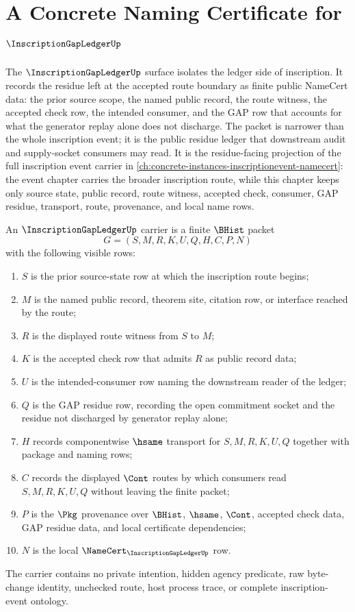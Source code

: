 \chapter{A Concrete Naming Certificate for $\InscriptionGapLedgerUp$}
\label{ch:concrete-instances-inscription-gap-ledger-namecert}

The $\InscriptionGapLedgerUp$ surface isolates the ledger side of inscription. It records the residue left at the accepted route boundary as finite public NameCert data: the prior source scope, the named public record, the route witness, the accepted check row, the intended consumer, and the GAP row that accounts for what the generator replay alone does not discharge. The packet is narrower than the whole inscription event; it is the public residue ledger that downstream audit and supply-socket consumers may read. It is the residue-facing projection of the full inscription event carrier in \autoref{ch:concrete-instances-inscriptionevent-namecert}: the event chapter carries the broader inscription route, while this chapter keeps only source state, public record, route witness, accepted check, consumer, GAP residue, transport, route, provenance, and local name rows.

\begin{definition}
\label{def:inscription-gap-ledger-carrier}
An $\InscriptionGapLedgerUp$ carrier is a finite $\BHist$ packet
$$
G=(S,M,R,K,U,Q,H,C,P,N)
$$
with the following visible rows:
\begin{enumerate}
\item $S$ is the prior source-state row at which the inscription route begins;
\item $M$ is the named public record, theorem site, citation row, or interface reached by the route;
\item $R$ is the displayed route witness from $S$ to $M$;
\item $K$ is the accepted check row that admits $R$ as public record data;
\item $U$ is the intended-consumer row naming the downstream reader of the ledger;
\item $Q$ is the GAP residue row, recording the open commitment socket and the residue not discharged by generator replay alone;
\item $H$ records componentwise $\hsame$ transport for $S,M,R,K,U,Q$ together with package and naming rows;
\item $C$ records the displayed $\Cont$ routes by which consumers read $S,M,R,K,U,Q$ without leaving the finite packet;
\item $P$ is the $\Pkg$ provenance over $\BHist$, $\hsame$, $\Cont$, accepted check data, GAP residue data, and local certificate dependencies;
\item $N$ is the local $\NameCert_{\InscriptionGapLedgerUp}$ row.
\end{enumerate}
The carrier contains no private intention, hidden agency predicate, raw byte-change identity, unchecked route, host process trace, or complete inscription-event ontology.
\end{definition}

